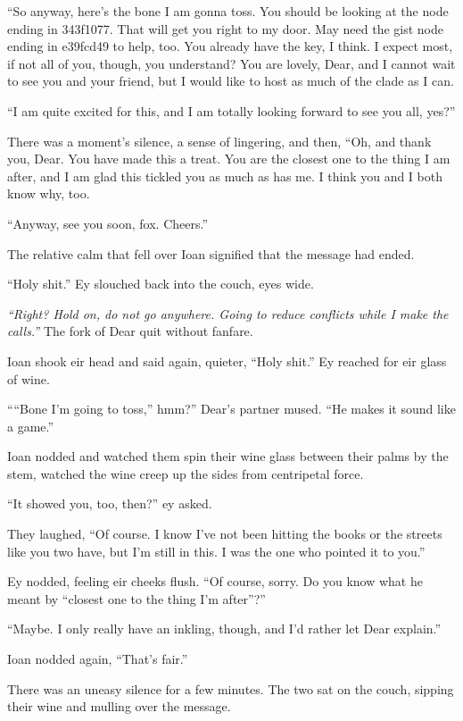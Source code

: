 ``So anyway, here's the bone I am gonna toss. You should be looking at the node ending in 343f1077. That will get you right to my door. May need the gist node ending in e39fcd49 to help, too. You already have the key, I think. I expect most, if not all of you, though, you understand? You are lovely, Dear, and I cannot wait to see you and your friend, but I would like to host as much of the clade as I can.

``I am quite excited for this, and I am totally looking forward to see you all, yes?''

There was a moment's silence, a sense of lingering, and then, ``Oh, and thank you, Dear. You have made this a treat. You are the closest one to the thing I am after, and I am glad this tickled you as much as has me. I think you and I both know why, too.

``Anyway, see you soon, fox. Cheers.''

The relative calm that fell over Ioan signified that the message had ended.

``Holy shit.'' Ey slouched back into the couch, eyes wide.

\emph{``Right? Hold on, do not go anywhere. Going to reduce conflicts while I make the calls.''} The fork of Dear quit without fanfare.

Ioan shook eir head and said again, quieter, ``Holy shit.'' Ey reached for eir glass of wine.

````Bone I'm going to toss,'' hmm?'' Dear's partner mused. ``He makes it sound like a game.''

Ioan nodded and watched them spin their wine glass between their palms by the stem, watched the wine creep up the sides from centripetal force.

``It showed you, too, then?'' ey asked.

They laughed, ``Of course. I know I've not been hitting the books or the streets like you two have, but I'm still in this. I was the one who pointed it to you.''

Ey nodded, feeling eir cheeks flush. ``Of course, sorry. Do you know what he meant by ``closest one to the thing I'm after''?''

``Maybe. I only really have an inkling, though, and I'd rather let Dear explain.''

Ioan nodded again, ``That's fair.''

There was an uneasy silence for a few minutes. The two sat on the couch, sipping their wine and mulling over the message.

